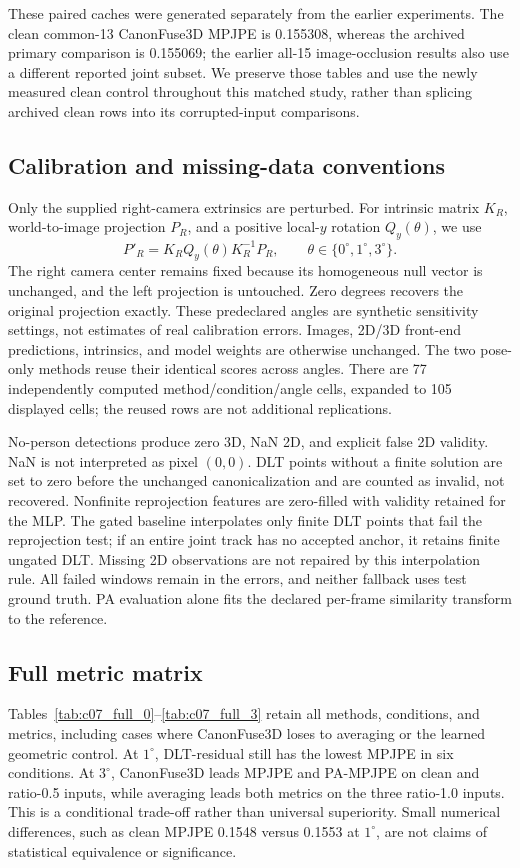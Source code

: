 These paired caches were generated separately from the earlier experiments. The clean common-13 CanonFuse3D MPJPE is 0.155308, whereas the archived primary comparison is 0.155069; the earlier all-15 image-occlusion results also use a different reported joint subset. We preserve those tables and use the newly measured clean control throughout this matched study, rather than splicing archived clean rows into its corrupted-input comparisons.

\subsection{Calibration and missing-data conventions}
Only the supplied right-camera extrinsics are perturbed. For intrinsic matrix $K_R$, world-to-image projection $P_R$, and a positive local-$y$ rotation $Q_y(\theta)$, we use
\[
 P'_R=K_R Q_y(\theta)K_R^{-1}P_R,\qquad
 \theta\in\{0^\circ,1^\circ,3^\circ\}.
\]
The right camera center remains fixed because its homogeneous null vector is unchanged, and the left projection is untouched. Zero degrees recovers the original projection exactly. These predeclared angles are synthetic sensitivity settings, not estimates of real calibration errors. Images, 2D/3D front-end predictions, intrinsics, and model weights are otherwise unchanged. The two pose-only methods reuse their identical scores across angles. There are 77 independently computed method/condition/angle cells, expanded to 105 displayed cells; the reused rows are not additional replications.

No-person detections produce zero 3D, NaN 2D, and explicit false 2D validity. NaN is not interpreted as pixel $(0,0)$. DLT points without a finite solution are set to zero before the unchanged canonicalization and are counted as invalid, not recovered. Nonfinite reprojection features are zero-filled with validity retained for the MLP. The gated baseline interpolates only finite DLT points that fail the reprojection test; if an entire joint track has no accepted anchor, it retains finite ungated DLT. Missing 2D observations are not repaired by this interpolation rule. All failed windows remain in the errors, and neither fallback uses test ground truth. PA evaluation alone fits the declared per-frame similarity transform to the reference.

\subsection{Full metric matrix}
Tables~\ref{tab:c07_full_0}--\ref{tab:c07_full_3} retain all methods, conditions, and metrics, including cases where CanonFuse3D loses to averaging or the learned geometric control. At $1^\circ$, DLT-residual still has the lowest MPJPE in six conditions. At $3^\circ$, CanonFuse3D leads MPJPE and PA-MPJPE on clean and ratio-0.5 inputs, while averaging leads both metrics on the three ratio-1.0 inputs. This is a conditional trade-off rather than universal superiority. Small numerical differences, such as clean MPJPE 0.1548 versus 0.1553 at $1^\circ$, are not claims of statistical equivalence or significance.

